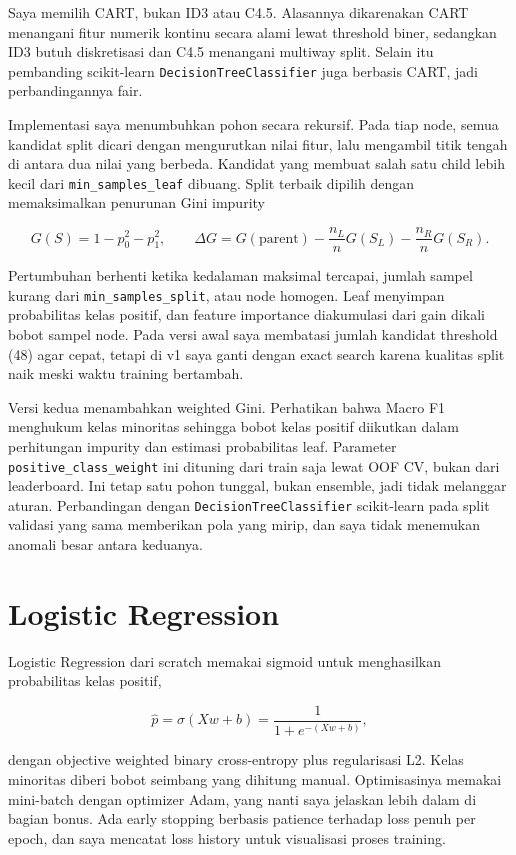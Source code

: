\documentclass[10pt,a4paper]{article}
\begin{document}
Saya memilih CART, bukan ID3 atau C4.5. Alasannya dikarenakan CART menangani fitur numerik kontinu secara alami lewat threshold biner, sedangkan ID3 butuh diskretisasi dan C4.5 menangani multiway split. Selain itu pembanding scikit-learn \texttt{DecisionTreeClassifier} juga berbasis CART, jadi perbandingannya fair.

Implementasi saya menumbuhkan pohon secara rekursif. Pada tiap node, semua kandidat split dicari dengan mengurutkan nilai fitur, lalu mengambil titik tengah di antara dua nilai yang berbeda. Kandidat yang membuat salah satu child lebih kecil dari \texttt{min\_samples\_leaf} dibuang. Split terbaik dipilih dengan memaksimalkan penurunan Gini impurity

\[
G(S)=1-p_0^2-p_1^2,\qquad
\Delta G=G(\text{parent})-\frac{n_L}{n}G(S_L)-\frac{n_R}{n}G(S_R).
\]

Pertumbuhan berhenti ketika kedalaman maksimal tercapai, jumlah sampel kurang dari \texttt{min\_samples\_split}, atau node homogen. Leaf menyimpan probabilitas kelas positif, dan feature importance diakumulasi dari gain dikali bobot sampel node. Pada versi awal saya membatasi jumlah kandidat threshold (48) agar cepat, tetapi di v1 saya ganti dengan exact search karena kualitas split naik meski waktu training bertambah.

Versi kedua menambahkan weighted Gini. Perhatikan bahwa Macro F1 menghukum kelas minoritas sehingga bobot kelas positif diikutkan dalam perhitungan impurity dan estimasi probabilitas leaf. Parameter \texttt{positive\_class\_weight} ini dituning dari train saja lewat OOF CV, bukan dari leaderboard. Ini tetap satu pohon tunggal, bukan ensemble, jadi tidak melanggar aturan. Perbandingan dengan \texttt{DecisionTreeClassifier} scikit-learn pada split validasi yang sama memberikan pola yang mirip, dan saya tidak menemukan anomali besar antara keduanya.

\section{Logistic Regression}

Logistic Regression dari scratch memakai sigmoid untuk menghasilkan probabilitas kelas positif,

\[
\hat{p}=\sigma(Xw+b)=\frac{1}{1+e^{-(Xw+b)}},
\]

dengan objective weighted binary cross-entropy plus regularisasi L2. Kelas minoritas diberi bobot seimbang yang dihitung manual. Optimisasinya memakai mini-batch dengan optimizer Adam, yang nanti saya jelaskan lebih dalam di bagian bonus. Ada early stopping berbasis patience terhadap loss penuh per epoch, dan saya mencatat loss history untuk visualisasi proses training.
\end{document}

